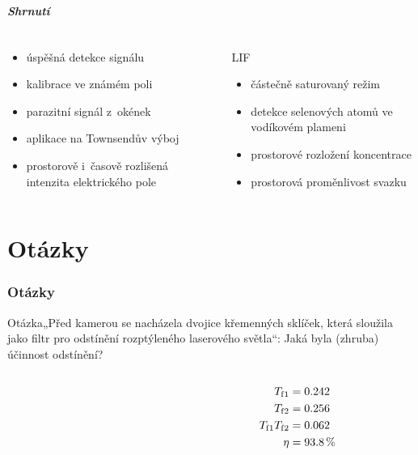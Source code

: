 \documentclass[10pt]{beamer}
\begin{document}
\begin{frame}
	\frametitle{Shrnutí}
	\begin{columns}[t]
	\begin{column}{0.5\textwidth}
		\EFISH
		\begin{itemize}
			\item úspěšná detekce signálu
			\item kalibrace ve známém poli
			\item parazitní signál z~okének
			\item aplikace na Townsendův výboj
			\item prostorově i~časově rozlišená intenzita elektrického pole
		\end{itemize}
	\end{column}
	\begin{column}{0.5\textwidth}
		LIF
		\begin{itemize}
			\item částečně saturovaný režim
			\item detekce selenových atomů ve vodíkovém plameni
			\item prostorové rozložení koncentrace 
			\item prostorová proměnlivost svazku
		\end{itemize}
	\end{column}
	\end{columns}
\end{frame}

\part{Otázky}
\section{Otázky}
\newcommand\question[1]{\begin{block}{Otázka}#1\end{block}}
\begin{frame}
	\partpage
\end{frame}

\begin{frame}
	\question{„Před kamerou se nacházela dvojice křemenných sklíček, která
		sloužila jako filtr pro odstínění rozptýleného laserového světla“:
		Jaká byla (zhruba) účinnost odstínění?}
	\begin{columns}
	\begin{column}{0.75\textwidth}
		
	\end{column}
	\begin{column}{0.25\textwidth}
		\begin{align*}
			T_\text{f}{}_1 &= \num{0.242} \\
			T_\text{f}{}_2 &= \num{0.256} \\
			T_\text{f}{}_1 T_\text{f}{}_2 &= \num{0.062} \\
			\eta &= \SI{93.8}{\percent}
		\end{align*}
	\end{column}
	\end{columns}
\end{frame}
\end{document}
